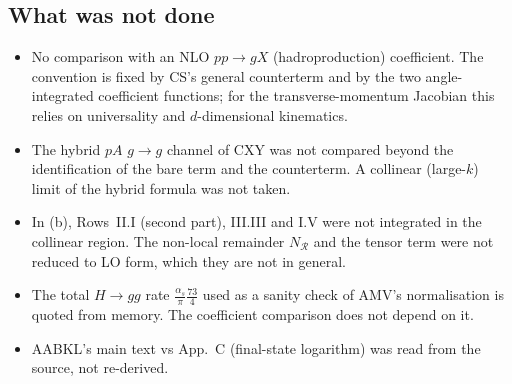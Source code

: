 \subsection{What was not done}
\begin{itemize}
\item No comparison with an NLO $pp\to gX$ (hadroproduction) coefficient. The convention is fixed by CS's general counterterm and by the two angle-integrated coefficient functions; for the transverse-momentum Jacobian this relies on universality and $d$-dimensional kinematics.
\item The hybrid $pA$ $g\to g$ channel of CXY was not compared beyond the identification of the bare term and the counterterm. A collinear (large-$k$) limit of the hybrid formula was not taken.
\item In (b), Rows~II.I (second part), III.III and I.V were not integrated in the collinear region. The non-local remainder $N_{\mathcal R}$ and the tensor term were not reduced to LO form, which they are not in general.
\item The total $H\to gg$ rate $\frac{\alpha_s}{\pi}\frac{73}{4}$ used as a sanity check of AMV's normalisation is quoted from memory. The coefficient comparison does not depend on it.
\item AABKL's main text vs App.~C (final-state logarithm) was read from the source, not re-derived.
\end{itemize}
